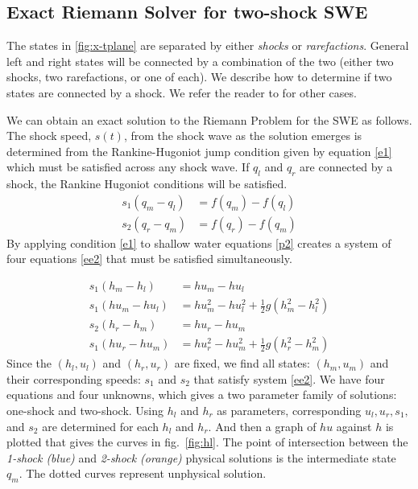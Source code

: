 \documentclass[12pt,a4paper]{article}
\begin{document}
	
	\subsection{Exact Riemann Solver for two-shock SWE}
	The states in \ref{fig:x-tplane} are separated by either {\em shocks} or {\em rarefactions}. General left and right states will be connected by a combination of the two (either two shocks, two rarefactions, or one of each).  We describe how to determine if two states are connected by a shock.  We refer the reader to \cite{leveque2002finite} for other cases. 
	
	We can obtain an exact solution to the Riemann Problem for the SWE as follows. 
	The shock speed, $s(t)$,  from the shock wave as the solution emerges is determined from the Rankine-Hugoniot jump condition given by equation \eqref{e1}  which must be satisfied across any shock wave.  If $q_l$ and $q_r$ are connected by a shock, the Rankine Hugoniot conditions will be satisfied\cite{ma-ah-be-ca-ge-ha-ke-le-le:2016}. 
	\begin{equation}
		\begin{aligned}
			s_1(q_{m} - q_{l}) & = f(q_{m}) - f(q_{l}) \\
			s_2(q_{r} - q_{m}) & = f(q_{r}) - f(q_{m})
		\end{aligned}
		\label{e1}
	\end{equation}
	By applying condition  \eqref{e1} to shallow water equations \eqref{p2}  creates a system of four equations \eqref{ee2} that must be satisfied simultaneously. 
	
	\begin{equation}
		\begin{aligned}
			s_1(h_{m} - h_{l}) & = hu_{m} - hu_{l} \\
			s_1(hu_{m} - hu_{l})  &= hu_{m}^{2} - hu_{l}^{2} + \frac{1}{2}g(h_{m}^{2} - h_{l}^2)\\
			s_2(h_{r} - h_{m})  &=  hu_{r} - hu_{m}\\
			s_1(hu_{r} - hu_{m})  &= hu_{r}^{2} - hu_{m}^{2} + \frac{1}{2}g(h_{r}^{2} - h_{m}^2)
		\end{aligned}
		\label{ee2}
	\end{equation}
	Since the $(h_l,u_l)$ and $(h_r,u_r)$ are fixed, we find all states: $(h_m,u_m)$  and their corresponding speeds: $s_1$ and $s_2$ that satisfy system  \eqref{ee2}. We have four equations and four unknowns, which gives a two parameter family of solutions: one-shock and two-shock. Using $h_l$ and $h_r$ as parameters, corresponding $u_l,u_r,s_1, $and $s_2$ are determined for each $h_l$ and $h_r$. And then a graph of $hu$ against $h$ is plotted that gives the curves in fig.~\ref{fig:hl}. The point of intersection between the {\em 1-shock (blue)} and  {\em2-shock (orange)} physical solutions is the intermediate state $q_m$. The dotted curves represent unphysical solution\cite{leveque2002finite}.
	
\end{document}
